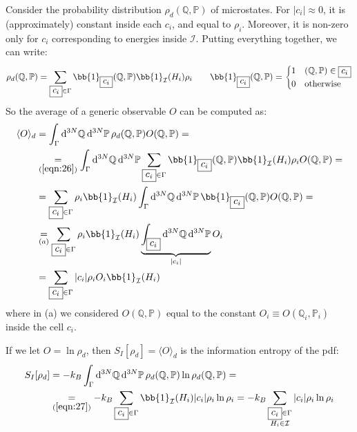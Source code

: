 \documentclass[../template.tex]{subfiles}
\begin{document}
Consider the probability distribution $\rho_d(\mathbb{Q}, \mathbb{P})$ of microstates. For $|c_i| \approx 0$, it is (approximately) constant inside each $\boxed{c_i}$, and equal to $\rho_i$. Moreover, it is non-zero only for $\boxed{c_i}$ corresponding to energies inside $\mathcal{I}$. Putting everything together, we can write:
\begin{align}\label{eqn:26}
    \rho_d(\mathbb{Q}, \mathbb{P}) = \sum_{\boxed{c_i} \in \Gamma} \bb{1}_{\boxed{c_i}}(\mathbb{Q}, \mathbb{P}) \bb{1}_{\mathcal{I}}(H_i) \rho_i \qquad \bb{1}_{\boxed{c_i}}(\mathbb{Q}, \mathbb{P}) = \begin{cases}
        1 & (\mathbb{Q},\mathbb{P}) \in \boxed{c_i}\\
        0 & \text{otherwise}
    \end{cases}
\end{align}
So the average of a generic observable $O$ can be computed as:
\begin{align} \nonumber
    \langle O \rangle_d &= \int_{\Gamma} \dd[3N]{\mathbb{Q}} \dd[3N]{\mathbb{P}} \rho_d(\mathbb{Q}, \mathbb{P}) O(\mathbb{Q}, \mathbb{P}) =\\ \nonumber
    &\underset{(\ref{eqn:26})}{=}  \int_{\Gamma} \dd[3N]{\mathbb{Q}} \dd[3N]{\mathbb{P}} \sum_{\boxed{c_i} \in \Gamma} \bb{1}_{\boxed{c_i}}(\mathbb{Q}, \mathbb{P}) \bb{1}_{\mathcal{I}}(H_i) \rho_iO(\mathbb{Q}, \mathbb{P}) =
    \\ \nonumber
    &=\sum_{\boxed{c_i} \in \Gamma} \rho_i \bb{1}_{\mathcal{I}}(H_i) \int_{\Gamma} \dd[3N]{\mathbb{Q}}\dd[3N]{\mathbb{P}} \bb{1}_{\boxed{c_i}}(\mathbb{Q}, \mathbb{P}) O(\mathbb{Q}, \mathbb{P}) =\\ \nonumber
    &\underset{(a)}{=}  \sum_{\boxed{c_i} \in \Gamma} \rho_i \bb{1}_{\mathcal{I}}(H_i) \underbrace{\int_{\boxed{c_i}} \dd[3N]{\mathbb{Q}} \dd[3N]{\mathbb{P}}}_{|c_i|} O_i\\ \label{eqn:27}
    &= \sum_{\boxed{c_i} \in \Gamma}|c_i| \rho_i O_i \bb{1}_{\mathcal{I}}(H_i)
\end{align}
where in (a) we considered $O(\mathbb{Q}, \mathbb{P})$ equal to the constant $O_i \equiv O(\mathbb{Q}_i, \mathbb{P}_i)$ inside the cell $\boxed{c_i}$.

\medskip

If we let $O = \ln \rho_d$, then $S_I[\rho_d] = \langle O \rangle_d$ is the information entropy of the pdf:
\begin{align}\label{eqn:28}
    S_I[\rho_d] &= - k_B \int_{\Gamma} \dd[3N]{\mathbb{Q}} \dd[3N]{\mathbb{P}}\rho_d(\mathbb{Q}, \mathbb{P}) \ln \rho_d(\mathbb{Q}, \mathbb{P})  =\\
    &\underset{(\ref{eqn:27})}{=}  - k_B \sum_{\boxed{c_i} \in \Gamma} \bb{1}_{\mathcal{I}}(H_i) |c_i| \rho_i \ln \rho_i = -k_B \sum_{\substack{\boxed{c_i} \in \Gamma\\H_i \in \mathcal{I}}} |c_i| \rho_i \ln \rho_i
\end{align}
\end{document}
